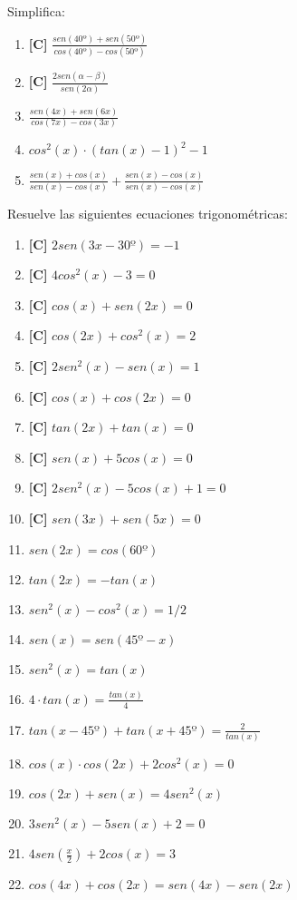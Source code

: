 \Exercicio Simplifica:

\begin{enumerate}[topsep=0pt]
	\item \textbf{[C]} $\frac{sen(40º) + sen(50º)}{cos(40º) - cos(50º)}$
	\item \textbf{[C]} $\frac{2sen(\alpha - \beta)}{sen(2\alpha)}$
	\item $ \frac{sen(4x)+sen(6x)}{cos(7x)-cos(3x)} $
	\item $cos^2(x) \cdot (tan(x) - 1)^2 -1$
	\item $ \frac{sen(x)+cos(x)}{sen(x)-cos(x)} + \frac{sen(x)-cos(x)}{sen(x)-cos(x)}$
\end{enumerate}


\Exercicio Resuelve las siguientes ecuaciones trigonométricas:

\begin{enumerate}[topsep=0pt]
	\item \textbf{[C]} $ 2sen(3x-30º) = -1 $
	\item \textbf{[C]} $ 4 cos^2(x) -3 = 0$
	\item \textbf{[C]} $ cos(x) + sen(2x) = 0$
	\item \textbf{[C]} $ cos(2x) + cos^2(x) = 2$
	\item \textbf{[C]} $ 2 sen^2(x) - sen(x) = 1$
	\item \textbf{[C]} $ cos(x) + cos(2x) = 0$
	\item \textbf{[C]} $ tan(2x) + tan(x) = 0$
	\item \textbf{[C]} $ sen(x) + 5cos(x) = 0 $
	\item \textbf{[C]} $ 2 sen^2(x) - 5 cos(x) + 1 = 0 $
	\item \textbf{[C]} $ sen(3x) + sen(5x) = 0 $
	\item $sen(2x) = cos (60º)$
	\item $tan(2x) = - tan(x)$
	\item $sen^2(x) - cos^2(x)= 1/2$
	\item $sen(x) = sen(45º- x)$
	\item $sen^2(x) = tan(x)$
	\item $4 \cdot tan(x) = \frac{tan(x)}{4}$
	\item $tan(x - 45º) + tan(x + 45º) = \frac{2}{tan(x)}$
	\item $cos(x) \cdot cos(2x) + 2cos^2(x) = 0$
	\item $cos(2x) + sen(x) = 4sen^2(x)$
	\item $3sen^2(x) - 5sen(x) +2 = 0$
	\item $4 sen(\frac{x}{2}) + 2 cos(x) = 3$
	\item $cos(4x) + cos(2x) = sen(4x) - sen(2x)$
\end{enumerate}


